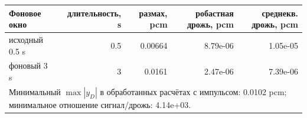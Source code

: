 \begin{tabular}{lrrrr}
\hline
Фоновое окно & длительность, s & размах, pcm & робастная дрожь, pcm & среднекв. дрожь, pcm\\
\hline
исходный 0.5 s & 0.5 & 0.00664 & 8.79e-06 & 1.05e-05\\
фоновый 3 s & 3 & 0.0161 & 2.47e-06 & 7.39e-06\\
\hline
\multicolumn{5}{l}{Минимальный $\max |y_D|$ в обработанных расчётах с импульсом: 0.0102 pcm; минимальное отношение сигнал/дрожь: 4.14e+03.}\\
\hline
\end{tabular}
